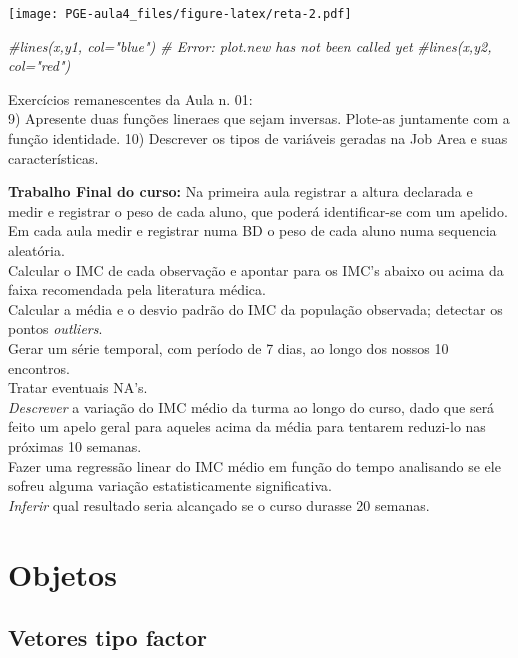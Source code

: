 \documentclass[]{article}
\newenvironment{Shaded}{\begin{snugshade}}{\end{snugshade}}
\newcommand{\CommentTok}[1]{\textcolor[rgb]{0.56,0.35,0.01}{\textit{#1}}}
\begin{document}
\texttt{[image: PGE-aula4\_files/figure-latex/reta-2.pdf]}

\begin{Shaded}
\begin{Highlighting}[]
\CommentTok{#lines(x,y1, col="blue") # Error: plot.new has not been called yet}
\CommentTok{#lines(x,y2, col="red")}
\end{Highlighting}
\end{Shaded}

Exercícios remanescentes da Aula n. 01:\\
9) Apresente duas funções lineraes que sejam inversas. Plote-as
juntamente com a função identidade. 10) Descrever os tipos de variáveis
geradas na Job Area e suas características.

\textbf{Trabalho Final do curso: } Na primeira aula registrar a altura
declarada e medir e registrar o peso de cada aluno, que poderá
identificar-se com um apelido.\\
Em cada aula medir e registrar numa BD o peso de cada aluno numa
sequencia aleatória.\\
Calcular o IMC de cada observação e apontar para os IMC's abaixo ou
acima da faixa recomendada pela literatura médica.\\
Calcular a média e o desvio padrão do IMC da população observada;
detectar os pontos \emph{outliers}.\\
Gerar um série temporal, com período de 7 dias, ao longo dos nossos 10
encontros.\\
Tratar eventuais NA's.\\
\emph{Descrever} a variação do IMC médio da turma ao longo do curso,
dado que será feito um apelo geral para aqueles acima da média para
tentarem reduzi-lo nas próximas 10 semanas.\\
Fazer uma regressão linear do IMC médio em função do tempo analisando se
ele sofreu alguma variação estatisticamente significativa.\\
\emph{Inferir} qual resultado seria alcançado se o curso durasse 20
semanas.

\section{Objetos}\label{objetos}

\subsection{Vetores tipo factor}\label{vetores-tipo-factor}
\end{document}
